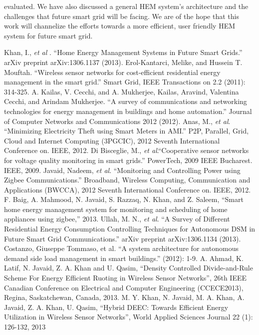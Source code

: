 \documentclass[journal]{IEEEtran}
\begin{document}
evaluated. We have also discussed a general HEM system's architecture and the challenges that future smart grid will be facing. We are of the hope that this work will channelize the efforts towards a more efficient, user friendly HEM system for future smart grid.
\begin{thebibliography}{17}
 Khan, I., \textit{et al} . ``Home Energy Management Systems in Future Smart Grids.'' arXiv preprint arXiv:1306.1137 (2013).
 Erol-Kantarci, Melike, and Hussein T. Mouftah. ``Wireless sensor networks for cost-efficient residential energy management in the smart grid.'' Smart Grid, IEEE Transactions on 2.2 (2011): 314-325.
 A. Kailas, V. Cecchi, and A. Mukherjee, Kailas, Aravind, Valentina Cecchi, and Arindam Mukherjee. ``A survey of communications and networking technologies for energy management in buildings and home automation.'' Journal of Computer Networks and Communications 2012 (2012).
 Anas, M., \textit{et al}. ``Minimizing Electricity Theft using Smart Meters in AMI.'' P2P, Parallel, Grid, Cloud and Internet Computing (3PGCIC), 2012 Seventh International Conference on. IEEE, 2012.
 Di Bisceglie, M., \textit{et al}.``Cooperative sensor networks for voltage quality monitoring in smart grids.'' PowerTech, 2009 IEEE Bucharest. IEEE, 2009.
 Javaid, Nadeem, \textit{et al}. ``Monitoring and Controlling Power using Zigbee Communications.'' Broadband, Wireless Computing, Communication and Applications (BWCCA), 2012 Seventh International Conference on. IEEE, 2012.
 F. Baig, A. Mahmood, N. Javaid, S. Razzaq, N. Khan, and Z. Saleem, ``Smart home energy management system for monitoring and scheduling of home appliances using zigbee,'' 2013.
 Ullah, M. N., \textit{et al}. ``A Survey of Different Residential Energy Consumption Controlling Techniques for Autonomous DSM in Future Smart Grid Communications.'' arXiv preprint arXiv:1306.1134 (2013).
 Costanzo, Giuseppe Tommaso, et al. ``A system architecture for autonomous demand side load management in smart buildings.'' (2012): 1-9.
 A. Ahmad, K. Latif, N. Javaid, Z. A. Khan and U. Qasim,	``Density Controlled Divide-and-Rule Scheme For Energy Efficient Ruoting in Wireless Sensor Networks'', 26th IEEE Canadian Conference on Electrical and Computer Engineering (CCECE2013), Regina, Saskatchewan, Canada, 2013.
  M. Y. Khan, N. Javaid, M. A. Khan, A. Javaid, Z. A. Khan, U. Qasim, ``Hybrid DEEC: Towards Efficient Energy Utilization in Wireless Sensor Networks'', World Applied Sciences Journal 22 (1): 126-132, 2013

\end{thebibliography}
\end{document}
